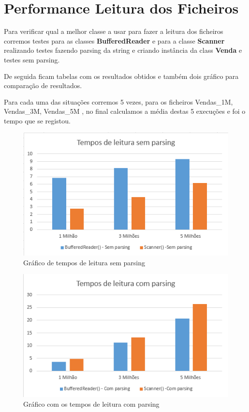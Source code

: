  
\section{Performance Leitura dos Ficheiros}

\par Para verificar qual a melhor classe a usar para fazer a leitura dos ficheiros corremos testes para as classes
\color{blue} \textbf{BufferedReader} \color{black} e para a classe \color{blue} \textbf{Scanner} \color{black} realizando testes
fazendo parsing da string e criando instância da class \color{blue} \textbf{Venda} \color{black} e testes sem parsing.
\par De seguida ficam tabelas com os resultados obtidos e também dois gráfico para comparação de resultados.

Para cada uma das situações corremos 5 vezes, para os ficheiros Vendas\_1M, Vendas\_3M, Vendas\_5M , no final calculamos a média destas 5 execuções e foi o tempo que se registou.

\begin{figure}[h!]
	\includegraphics[scale=1]{graficosemparsing}  
	\caption{Gráfico de tempos de leitura sem parsing }  
\end{figure}

\begin{figure}[h!]
	\includegraphics[scale=1]{graficocomparsing}  
	\caption{Gráfico com os tempos de leitura com parsing }  
\end{figure}


